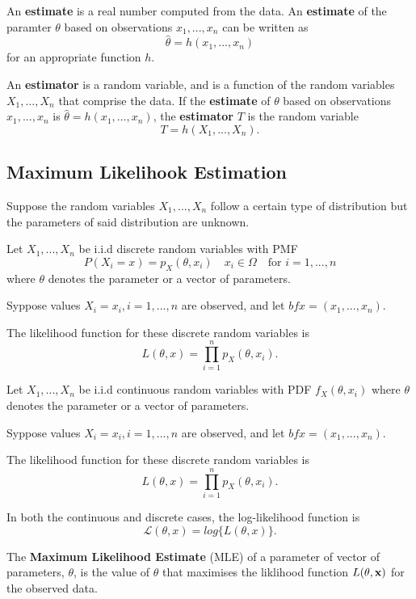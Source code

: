 \begin{definition}
  An {\bf estimate} is a real number computed from the data. An {\bf estimate} of the paramter $\theta$ based on observations $x_1,...,x_n$ can be written as
  \[\hat{\theta} = h(x_1,...,x_n)\]
  for an appropriate function $h$.
\end{definition}

\begin{definition}
  An {\bf estimator} is a random variable, and is a function of the random variables $X_1,...,X_n$ that comprise the data. If the {\bf estimate} of $\theta$ based on observations $x_1,...,x_n$ is $\hat{\theta} = h(x_1,...,x_n)$, the {\bf estimator} $T$ is the random variable
  \[T = h(X_1,...,X_n).\]
\end{definition} 

\subsection{Maximum Likelihook Estimation}

Suppose the random variables $X_1, ..., X_n$ follow a certain type of distribution but the parameters of said distribution are unknown.
\begin{definition}
    Let $X_1, ..., X_n$ be i.i.d discrete random variables with PMF
    \[P(X_i = x) =  p_X(\theta, x_i) \quad x_i \in \Omega \quad \text{for } i = 1,...,n\]
    where $\theta$ denotes the parameter or a vector of parameters.

    Syppose values $X_i = x_i, i=1,...,n$ are observed, and let ${bf x} = (x_1, ...,x_n)$.

    The likelihood function for these discrete random variables is
    \[L(\theta, x) = \prod_{i=1}^n p_X(\theta, x_i).\]
\end{definition}
\begin{definition}
    Let $X_1, ..., X_n$ be i.i.d continuous random variables with PDF $f_X(\theta, x_i)$
    where $\theta$ denotes the parameter or a vector of parameters.

    Syppose values $X_i = x_i, i=1,...,n$ are observed, and let ${bf x} = (x_1, ...,x_n)$.

    The likelihood function for these discrete random variables is
    \[L(\theta, x) = \prod_{i=1}^n p_X(\theta, x_i).\]
\end{definition}

\begin{definition}
    In both the continuous and discrete cases, the log-likelihood function is
    \[ \mathcal{L} (\theta, x) = log\{L(\theta, x)\}.\]
\end{definition}

\begin{definition}
  The {\bf Maximum Likelihood Estimate} (MLE) of a parameter of vector of parameters, $\theta$, is the value of $\theta$ that maximises the liklihood function $L(\theta, {\bf x})$ for the observed data.
\end{definition}
